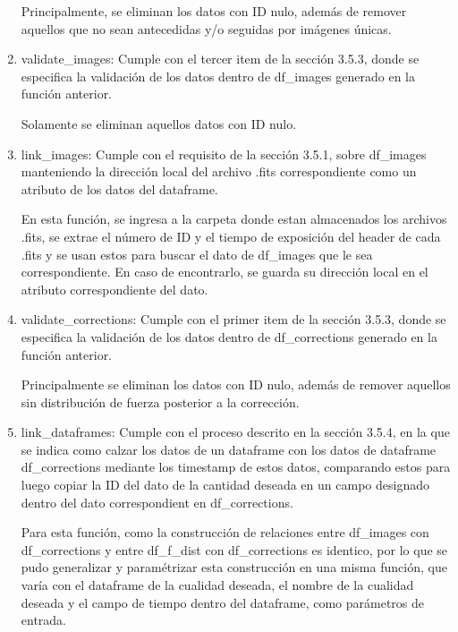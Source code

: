 \begin{enumerate}
    Principalmente, se eliminan los datos con ID nulo, además de remover aquellos que no sean antecedidas y/o seguidas por imágenes únicas.

    \item validate\_images: Cumple con el tercer item de la sección 3.5.3, donde se especifica la validación de los datos dentro de df\_images generado en la función anterior.

    Solamente se eliminan aquellos datos con ID nulo.

    \item link\_images: Cumple con el requisito de la sección 3.5.1, sobre df\_images manteniendo la dirección local del archivo .fits correspondiente como un atributo de los datos del dataframe.

    En esta función, se ingresa a la carpeta donde estan almacenados los archivos .fits, se extrae el número de ID y el tiempo de exposición del header de cada .fits y se usan estos para buscar el dato de df\_images que le sea correspondiente. En caso de encontrarlo, se guarda su dirección local en el atributo correspondiente del dato.

    \item validate\_corrections: Cumple con el primer item de la sección 3.5.3, donde se especifica la validación de los datos dentro de df\_corrections generado en la función anterior.

    Principalmente se eliminan los datos con ID nulo, además de remover aquellos sin distribución de fuerza posterior a la corrección.

    \item link\_dataframes: Cumple con el proceso descrito en la sección 3.5.4, en la que se indica como calzar los datos de un dataframe con los datos de dataframe df\_corrections mediante los timestamp de estos datos, comparando estos para luego copiar la ID del dato de la cantidad deseada en un campo designado dentro del dato correspondient en df\_corrections.

    Para esta función, como la construcción de relaciones entre df\_images con df\_corrections y entre df\_f\_dist con df\_corrections es identico, por lo que se pudo generalizar y paramétrizar esta construcción en una misma función, que varía con el dataframe de la cualidad deseada, el nombre de la cualidad deseada y el campo de tiempo dentro del dataframe, como parámetros de entrada.
    
\end{enumerate}

